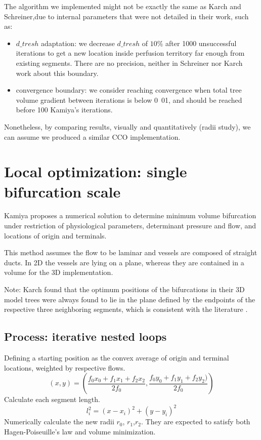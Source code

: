 \documentclass[a4paper, 11pt]{article} %
\begin{document}
The algorithm we implemented might not be exactly the same as Karch and Schreiner,due to internal parameters that were not detailed in their work, such as:
\begin{itemize}
\item $d\_tresh$ adaptation: we decrease $d\_tresh$ of $10\%$ after 1000 unsuccessful iterations to get a new location inside perfusion territory far enough from existing segments. There are no precision, neither in Schreiner nor Karch work about this boundary.
\item convergence boundary: we consider reaching convergence when total tree volume gradient between iterations is below \unit{0.01}{\milli\cubic\meter}, and should be reached before 100 Kamiya's iterations.
\end{itemize}
Nonetheless, by comparing results, visually and quantitatively (radii study), we can assume we produced a similar CCO implementation.




\section{Local optimization: single bifurcation scale}\label{Kamiya}
Kamiya proposes a numerical solution to determine minimum volume bifurcation under restriction of physiological parameters, determinant pressure and flow, and locations of origin and terminals.

This method assumes the flow to be laminar and vessels are composed of straight ducts. In 2D the vessels are lying on a plane, whereas they are contained in a volume for the 3D implementation. 

Note: Karch found that the optimum positions of the bifurcations in their 3D model trees were always found to lie in the plane defined by the endpoints of the respective three neighboring segments, which is consistent with the literature \cite{zamir1986branching}. 


\subsection*{Process: iterative nested loops}

Defining a starting position as the convex average of origin and terminal locations, weighted by respective flows.
\begin{equation}
(x,y) = (\frac{f_0x_0 + f_1x_1 + f_2x_2}{2f_0},\frac{f_0y_0 + f_1y_1 + f_2y_2 )}{2f_0})
\end{equation}
Calculate each segment length.
\begin{equation}
l_i^2 = (x - x_i)^2 + (y - y_i)^2
\label{length}
\end{equation}
Numerically calculate the new radii $r_0$, $r_1$,$r_2$. They are expected to satisfy both Hagen-Poiseuille's law and volume minimization.
\end{document}
